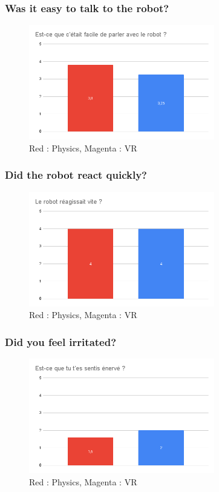     \subsubsection{Was it easy to talk to the robot?}
    \begin{figure}[!h]
    \centering
    \includegraphics[height=5cm]{Datas_childs/facile_parler.png}
    \caption{Red : Physics, Magenta : VR}
    \end{figure}
    \vspace*{0.5cm}

    \subsubsection{Did the robot react quickly?}
    \begin{figure}[!h]
    \centering
    \includegraphics[height=5cm]{Datas_childs/reagit_vite_.png}
    \caption{Red : Physics, Magenta : VR}
    \end{figure}
    
    \vspace*{0.5cm}

    \subsubsection{Did you feel irritated?}
    \begin{figure}[!h]
    \centering
    \includegraphics[height=5cm]{Datas_childs/enerve.png}
    \caption{Red : Physics, Magenta : VR}
    \end{figure}
    \vspace*{0.5cm}
    
